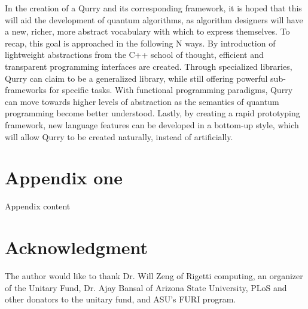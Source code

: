 \documentclass[a4paper,twocolumn,11pt,accepted=2017-05-09]{quantumarticle}
\begin{document}
In the creation of a Qurry and its corresponding framework, it is hoped that this will aid the development of quantum algorithms, as algorithm designers will have a new, richer, more abstract vocabulary with which to express themselves.
To recap, this goal is approached in the following N ways.
By introduction of lightweight abstractions from the C++ school of thought, efficient and transparent programming interfaces are created.
Through specialized libraries, Qurry can claim to be a generalized library, while still offering powerful sub-frameworks for specific tasks.
With functional programming paradigms, Qurry can move towards higher levels of abstraction as the semantics of quantum programming become better understood.
Lastly, by creating a rapid prototyping framework, new language features can be developed in a bottom-up style, which will allow Qurry to be created naturally, instead of artificially.

 \section{Appendix one}
Appendix content

\section*{Acknowledgment}

The author would like to thank Dr. Will Zeng of Rigetti computing, an organizer of the Unitary Fund, Dr. Ajay Bansal of Arizona State University, PLoS and other donators to the unitary fund, and ASU's FURI program.

\newpage



\end{document}
